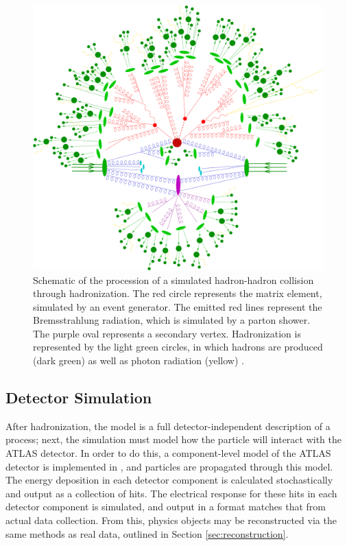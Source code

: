 \begin{figure}[!thp]
    \centering
    \includegraphics[width=1\textwidth]{chapters/chapter3_eventreco/images/parton-shower.png}

    \caption[Schematic of the procession of a simulated hadron-hadron collision.]{Schematic of the procession of a simulated hadron-hadron collision through hadronization. The red circle represents the matrix element, simulated by an event generator. The emitted red lines represent the Bremsstrahlung radiation, which is simulated by a parton shower. The purple oval represents a secondary vertex. Hadronization is represented by the light green circles, in which hadrons are produced (dark green) as well as photon radiation (yellow) \cite{parton-shower-sketch}.}
    \label{fig:parton-shower-sketch}
\end{figure}


\subsection{Detector Simulation}  \label{ssec:simulation} %
After hadronization, the model is a full detector-independent description of a process; next, the simulation must model how the particle will interact with the ATLAS detector. In order to do this, a component-level model of the ATLAS detector is implemented in \GEANTFOUR \cite{geant4}, and particles are propagated through this model. The energy deposition in each detector component is calculated stochastically and output as a collection of hits. The electrical response for these hits in each detector component is simulated, and output in a format matches that from actual data collection. From this, physics objects may be reconstructed via the same methods as real data, outlined in Section \ref{sec:reconstruction}.

